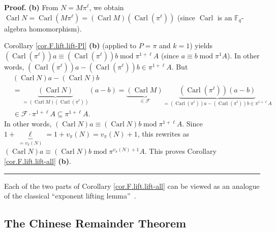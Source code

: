 \documentclass[numbers=enddot,12pt,final,onecolumn,notitlepage]{scrartcl}%
\theoremstyle{definition}
\newenvironment{proof}[1][Proof]{\noindent\textbf{#1.} }{\ \rule{0.5em}{0.5em}}
\begin{document}
\begin{proof}
\textbf{(b)} From $N=M\pi^{\ell}$, we obtain $\operatorname*{Carl}%
N=\operatorname*{Carl}\left(  M\pi^{\ell}\right)  =\left(
\operatorname*{Carl}M\right)  \left(  \operatorname*{Carl}\left(  \pi^{\ell
}\right)  \right)  $ (since $\operatorname*{Carl}$ is an $\mathbb{F}_{q}%
$-algebra homomorphism).

Corollary \ref{cor.F.lift.lift-Pl} \textbf{(b)} (applied to $P=\pi$ and $k=1$)
yields $\left(  \operatorname*{Carl}\left(  \pi^{\ell}\right)  \right)
a\equiv\left(  \operatorname*{Carl}\left(  \pi^{\ell}\right)  \right)
b\operatorname{mod}\pi^{1+\ell}A$ (since $a\equiv b\operatorname{mod}\pi^{1}%
A$). In other words, $\left(  \operatorname*{Carl}\left(  \pi^{\ell}\right)
\right)  a-\left(  \operatorname*{Carl}\left(  \pi^{\ell}\right)  \right)
b\in\pi^{1+\ell}A$. But%
\begin{align*}
&  \left(  \operatorname*{Carl}N\right)  a-\left(  \operatorname*{Carl}%
N\right)  b\\
&  =\underbrace{\left(  \operatorname*{Carl}N\right)  }_{=\left(
\operatorname*{Carl}M\right)  \left(  \operatorname*{Carl}\left(  \pi^{\ell
}\right)  \right)  }\left(  a-b\right)  =\underbrace{\left(
\operatorname*{Carl}M\right)  }_{\in\mathcal{F}}\underbrace{\left(
\operatorname*{Carl}\left(  \pi^{\ell}\right)  \right)  \left(  a-b\right)
}_{=\left(  \operatorname*{Carl}\left(  \pi^{\ell}\right)  \right)  a-\left(
\operatorname*{Carl}\left(  \pi^{\ell}\right)  \right)  b\in\pi^{1+\ell}A}\\
&  \in\mathcal{F}\cdot\pi^{1+\ell}A\subseteq\pi^{1+\ell}A.
\end{align*}
In other words, $\left(  \operatorname*{Carl}N\right)  a\equiv\left(
\operatorname*{Carl}N\right)  b\operatorname{mod}\pi^{1+\ell}A$. Since
$1+\underbrace{\ell}_{=v_{\pi}\left(  N\right)  }=1+v_{\pi}\left(  N\right)
=v_{\pi}\left(  N\right)  +1$, this rewrites as $\left(  \operatorname*{Carl}%
N\right)  a\equiv\left(  \operatorname*{Carl}N\right)  b\operatorname{mod}%
\pi^{v_{\pi}\left(  N\right)  +1}A$. This proves Corollary
\ref{cor.F.lift.lift-all} \textbf{(b)}.
\end{proof}

Each of the two parts of Corollary \ref{cor.F.lift.lift-all} can be viewed as
an analogue of the classical \textquotedblleft exponent lifting
lemma\textquotedblright\ \cite[version with solutions (ancillary file),
(12.349)]{reiner-hopf}.

\subsection{The Chinese Remainder Theorem}
\end{document}
